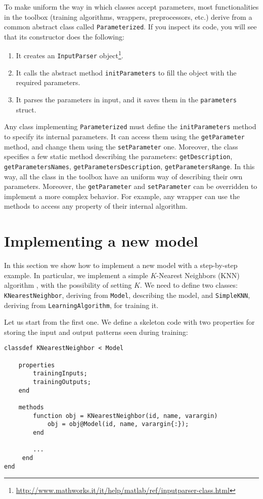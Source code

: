 To make uniform the way in which classes accept parameters, most functionalities in the toolbox (training algorithms, wrappers, preprocessors, etc.) derive from a common abstract class called \verb|Parameterized|. If you inspect its code, you will see that its constructor does the following:

\begin{enumerate}
\item It creates an \verb|InputParser| object\footnote{\url{http://www.mathworks.it/it/help/matlab/ref/inputparser-class.html}}.
\item It calls the abstract method \verb|initParameters| to fill the object with the required parameters.
\item It parses the parameters in input, and it saves them in the \verb|parameters| struct.
\end{enumerate}

\noindent Any class implementing \verb|Parameterized| must define the \verb|initParameters| method to specify its internal parameters. It can access them using the \verb|getParameter| method, and change them using the \verb|setParameter| one. Moreover, the class specifies a few static method describing the parameters: \verb|getDescription|, \verb|getParametersNames|, \verb|getParametersDescription|, \verb|getParametersRange|. In this way, all the class in the toolbox have an uniform way of describing their own parameters. Moreover, the \verb|getParameter| and \verb|setParameter| can be overridden to implement a more complex behavior. For example, any wrapper can use the methods to access any property of their internal algorithm.

\section{Implementing a new model}

In this section we show how to implement a new model with a step-by-step example. In particular, we implement a simple $K$-Nearest Neighbors (KNN) algorithm \cite{alpaydin2004introduction}, with the possibility of setting $K$. We need to define two classes: \verb|KNearestNeighbor|, deriving from \verb|Model|, describing the model, and \verb|SimpleKNN|, deriving from \verb|LearningAlgorithm|, for training it.

Let us start from the first one. We define a skeleton code with two properties for storing the input and output patterns seen during training:

\begin{lstlisting}
classdef KNearestNeighbor < Model
    
    properties
        trainingInputs;
        trainingOutputs;
    end
    
    methods
        function obj = KNearestNeighbor(id, name, varargin)
            obj = obj@Model(id, name, varargin{:});
        end
        
        ...
     end
end
\end{lstlisting}

